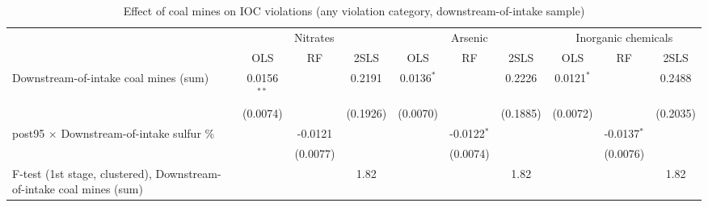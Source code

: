 
\begin{table}[htbp]
   
   \caption{\label{2sls_placebo_dwnstrmintake_minevio_allcat_ivsum_binvio} Effect of coal mines on IOC violations (any violation category, downstream-of-intake sample)}
   \bigskip
   
   \centering
   
   \begin{adjustbox}{width = \textwidth, center}
      
      
      \begin{tabular}{lccccccccc}
         \toprule
         
          & \multicolumn{3}{c}{Nitrates} & \multicolumn{3}{c}{Arsenic} & \multicolumn{3}{c}{Inorganic chemicals}\\
         
                                                                              & OLS           & RF            & 2SLS          & OLS           & RF            & 2SLS          & OLS           & RF            & 2SLS\\  
         
         \midrule 
         Downstream-of-intake coal mines (sum)                                & 0.0156$^{**}$ &               & 0.2191        & 0.0136$^{*}$  &               & 0.2226        & 0.0121$^{*}$  &               & 0.2488\\   
                                                                              & (0.0074)      &               & (0.1926)      & (0.0070)      &               & (0.1885)      & (0.0072)      &               & (0.2035)\\   
         post95 $\times$ Downstream-of-intake sulfur \%                       &               & -0.0121       &               &               & -0.0122$^{*}$ &               &               & -0.0137$^{*}$ &   \\   
                                                                              &               & (0.0077)      &               &               & (0.0074)      &               &               & (0.0076)      &   \\   
         
         F-test (1st stage, clustered), Downstream-of-intake coal mines (sum) &               &               & 1.82          &               &               & 1.82          &               &               & 1.82\\  
         

\end{tabular}
\end{adjustbox}
\end{table}
